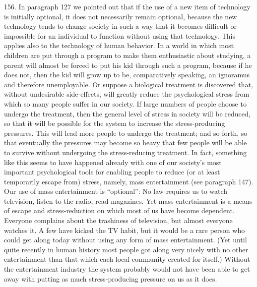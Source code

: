 \documentclass{article}
\begin{document}
156.  In  paragraph  127  we  pointed  out  that  if  the  use  of  a  new  item  of  technology  is  initially 
optional,  it  does  not  necessarily  remain  optional,  because  the  new  technology  tends  to  change  
society in such a way that it becomes difficult or impossible for an individual to function without 
using that technology.  This applies also to the technology of human behavior.  In a world in which 
most children are put through a program to make them enthusiastic about studying, a parent will 
almost be forced to put his kid through such a program, because if he does not, then the kid will 
grow up to be, comparatively speaking, an ignoramus and therefore unemployable.  Or suppose a 
biological  treatment  is  discovered  that,  without  undesirable  side-effects,  will  greatly  reduce  the  
psychological stress from which so many people suffer in our society.  If large numbers of people 
choose to undergo the treatment, then the general level of stress in society will be reduced, so that 
it will be possible for the system to increase the stress-producing pressures.  This will lead more 
people  to  undergo  the  treatment;  and  so  forth,  so  that  eventually  the  pressures  may  become  so  
heavy that few people will be able to survive without undergoing the stress-reducing treatment.  In 
fact, something like this seems to have happened already with one of our society’s most important 
psychological  tools  for  enabling  people  to  reduce  (or  at  least  temporarily  escape  from)  stress,  
namely, mass entertainment (see paragraph 147).  Our use of mass entertainment is “optional”: No 
law requires us to watch television, listen to the radio, read magazines.  Yet mass entertainment is 
a means of escape and stress-reduction on which most of us have become dependent.  Everyone 
complains about the trashiness of television, but almost everyone watches it.  A few have kicked 
the TV habit, but it would be a rare person who could get along today without using any form of 
mass entertainment.  (Yet until quite recently in human history most people got along very nicely 
with no other entertainment than that which each local community created for itself.) Without the 
entertainment industry the system probably would not have been able to get away with putting as 
much stress-producing pressure on us as it does. \vspace{\baselineskip}
\end{document}
